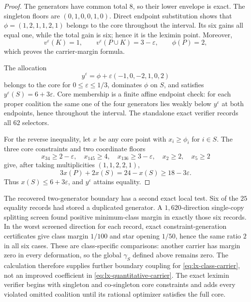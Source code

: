\begin{proof}
The generators have common total $8$, so their lower envelope is exact.  The
singleton floors are $(0,1,0,0,1,0)$.  Direct endpoint substitution shows
that $\phi=(1,2,1,1,2,1)$ belongs to the core throughout the interval.  Its
six gains all equal one, while the total gain is six; hence it is the leximin
point.  Moreover,
\[
 v^\varepsilon(K)=1,\qquad
 v^\varepsilon(P\cup K)=3-\varepsilon,\qquad
 \phi(P)=2,
\]
which proves the carrier-margin formula.

The allocation
\[
 y^\varepsilon
 =\phi+\varepsilon(-1,0,-2,1,0,2)
\]
belongs to the core for $0\leq\varepsilon\leq1/3$, dominates $\phi$ on $S$,
and satisfies $y^\varepsilon(S)=6+3\varepsilon$.  Core membership is a finite
affine endpoint check: for each proper coalition the same one of the four
generators lies weakly below $y^\varepsilon$ at both endpoints, hence
throughout the interval.  The standalone exact verifier records all $62$
selectors.

For the reverse inequality, let $x$ be any core point with
$x_i\geq\phi_i$ for $i\in S$.  The three core constraints and two coordinate
floors
\[
 x_{34}\geq2-\varepsilon,\quad
 x_{145}\geq4,\quad
 x_{136}\geq3-\varepsilon,\quad
 x_2\geq2,\quad x_5\geq2
\]
give, after taking multiplicities $(1,1,2,2,1)$,
\[
 3x(P)+2x(S)=24-x(S)\geq18-3\varepsilon.
\]
Thus $x(S)\leq6+3\varepsilon$, and $y^\varepsilon$ attains equality.
\end{proof}

The recovered two-generator boundary has a second exact local test.  Six of
the $25$ equality records had stored a duplicated generator.  A
$1{,}620$-direction single-copy splitting screen found positive
minimum-class margin in exactly those six records.  In the worst screened
direction for each record, exact constraint-generation certificates give
class margin $1/100$ and star opening $1/50$, hence the same ratio $2$ in all
six cases.  These are class-specific comparisons: another carrier has margin
zero in every deformation, so the global $\gamma_S$ defined above remains
zero.  The calculation therefore supplies further boundary coupling for
\eqref{eq:lx-class-carrier}, not an improved coefficient in
\eqref{eq:lx-quantitative-carrier}.  The exact leximin verifier begins with
singleton and co-singleton core constraints and adds every violated omitted
coalition until its rational optimizer satisfies the full core.

